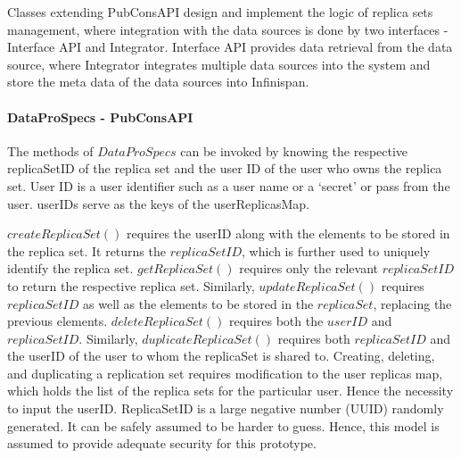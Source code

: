 \documentclass[conference]{IEEEtran}
\begin{document}
Classes extending PubConsAPI design and implement the logic of replica sets management, where integration with the data sources is done by two interfaces - Interface API and Integrator. Interface API provides data retrieval from the data source, where Integrator integrates multiple data sources into the system and store the meta data of the data sources into Infinispan.

\paragraph*{DataProSpecs - PubConsAPI}
The methods of $DataProSpecs$ can be invoked by knowing the respective replicaSetID of the replica set and the user ID of the user who owns the replica set. User ID is a user identifier such as a user name or a `secret' or pass from the user. userIDs serve as the keys of the userReplicasMap. 

$createReplicaSet()$ requires the userID along with the elements to be stored in the replica set. It returns the $replicaSetID$, which is further used to uniquely identify the replica set. $getReplicaSet()$ requires only the relevant $replicaSetID$ to return the respective replica set. Similarly, $updateReplicaSet()$ requires $replicaSetID$ as well as the elements to be stored in the $replicaSet$, replacing the previous elements. $deleteReplicaSet()$ requires both the $userID$ and $replicaSetID$. Similarly, $duplicateReplicaSet()$ requires both $replicaSetID$ and the userID of the user to whom the replicaSet is shared to. Creating, deleting, and duplicating a replication set requires modification to the user replicas map, which holds the list of the replica sets for the particular user. Hence the necessity to input the userID. ReplicaSetID is a large negative number (UUID) randomly generated. It can be safely assumed to be harder to guess. Hence, this model is assumed to provide adequate security for this prototype.
\end{document}
